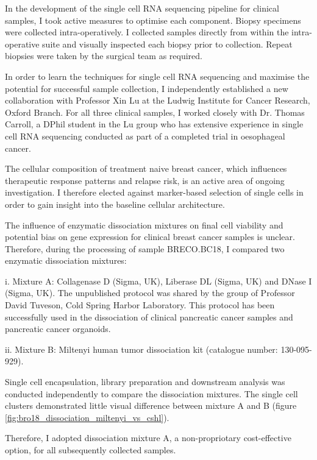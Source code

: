 In the development of the single cell RNA sequencing pipeline for clinical samples, I took active measures to optimise each component. Biopsy specimens were collected intra-operatively. I collected samples directly from within the intra-operative suite and visually inspected each biopsy prior to collection. Repeat biopsies were taken by the surgical team as required.

In order to learn the techniques for single cell RNA sequencing and maximise the potential for successful sample collection, I independently established a new collaboration with Professor Xin Lu at the Ludwig Institute for Cancer Research, Oxford Branch. For all three clinical samples, I worked closely with Dr. Thomas Carroll, a DPhil student in the Lu group who has extensive experience in single cell RNA sequencing conducted as part of a completed trial in oesophageal cancer.

The cellular composition of treatment naive breast cancer, which influences therapeutic response patterns and relapse risk, is an active area of ongoing investigation. I therefore elected against marker-based selection of single cells in order to gain insight into the baseline cellular architecture.

The influence of enzymatic dissociation mixtures on final cell viability and potential bias on gene expression for clinical breast cancer samples is unclear. Therefore, during the processing of sample BRECO.BC18, I compared two enzymatic dissociation mixtures:

i. Mixture A: Collagenase D (Sigma, UK), Liberase DL (Sigma, UK) and DNase I (Sigma, UK). The unpublished protocol was shared by the group of Professor David Tuveson, Cold Spring Harbor Laboratory. This protocol has been successfully used in the dissociation of clinical pancreatic cancer samples and pancreatic cancer organoids.

ii. Mixture B: Miltenyi human tumor dissociation kit (catalogue number: 130-095-929).

Single cell encapsulation, library preparation and downstream analysis was conducted independently to compare the dissociation mixtures. The single cell clusters demonstrated little visual difference between mixture A and B (figure \ref{fig:bro18_dissociation_miltenyi_vs_cshl}). 

Therefore, I adopted dissociation mixture A, a non-propriotary cost-effective option, for all subsequently collected samples.


